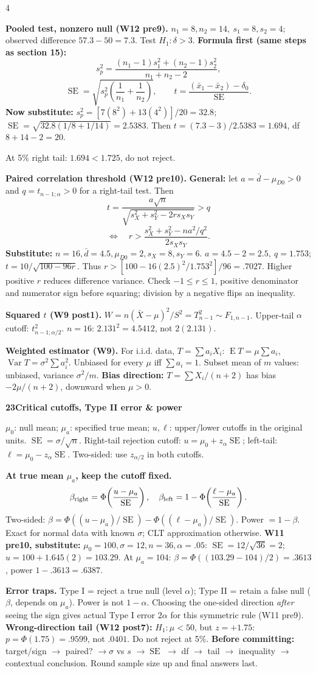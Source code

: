 \documentclass[a4paper,landscape]{article}
\newcommand{\head}[2][late]{\par\vspace{3pt}\noindent\colorbox{#1}{\parbox{\dimexpr\linewidth-6pt}{\color{white}\bfseries #2}}\par\vspace{1pt}}
\newcommand{\cue}[1]{\par\textbf{#1}\enspace}
\newcommand{\E}{\operatorname{E}}
\newcommand{\V}{\operatorname{Var}}
\newcommand{\SE}{\operatorname{SE}}
\newcommand{\xb}{\bar x}
\newcommand{\Xb}{\bar X}
\newcommand{\db}{\bar d}
\begin{document}
\begin{multicols*}{4}
\cue{Pooled test, nonzero null (W12 pre9).}
\(n_1=8,n_2=14,\ s_1=8,s_2=4\); observed difference \(57.3-50=7.3\). Test \(H_1:\delta>3\).
\textbf{Formula first (same steps as section 15):}
\[s_p^2=\frac{(n_1-1)s_1^2+(n_2-1)s_2^2}{n_1+n_2-2},\]
\[\SE=\sqrt{s_p^2\!\left(\frac1{n_1}+\frac1{n_2}\right)},\qquad
 t=\frac{(\xb_1-\xb_2)-\delta_0}{\SE}.\]
\textbf{Now substitute:} \(s_p^2=[7(8^2)+13(4^2)]/20=32.8\); \(\SE=\sqrt{32.8(1/8+1/14)}=2.5383\). Then \(t=(7.3-3)/2.5383=1.694\), df \(8+14-2=20\).\par
At 5\% right tail: \(1.694<1.725\), do not reject.
\cue{Paired correlation threshold (W12 pre10).}
\textbf{General:} let \(a=\db-\mu_{D0}>0\) and \(q=t_{n-1;\alpha}>0\) for a right-tail test. Then
\[t=\frac{a\sqrt n}{\sqrt{s_X^2+s_Y^2-2rs_Xs_Y}}>q\]
\[\Longleftrightarrow\quad r>\frac{s_X^2+s_Y^2-na^2/q^2}{2s_Xs_Y}.\]
\textbf{Substitute:}
\(n=16,\db=4.5,\mu_{D0}=2,s_X=8,s_Y=6\).
\(a=4.5-2=2.5,\ q=1.753\); \(t=10/\sqrt{100-96r}\). Thus \(r>[100-16(2.5)^2/1.753^2]/96=.7027\).
Higher positive \(r\) reduces difference variance. Check \(-1\le r\le1\), positive denominator and numerator sign before squaring; division by a negative flips an inequality.
\cue{Squared \(t\) (W9 post1).} \(W=n(\Xb-\mu)^2/S^2=T_{n-1}^2\sim F_{1,n-1}\). Upper-tail \(\alpha\) cutoff: \(t_{n-1;\alpha/2}^2\). \(n=16\): \(2.131^2=4.5412\), not \(2(2.131)\).
\cue{Weighted estimator (W9).} For i.i.d. data, \(T=\sum a_iX_i\): \(\E T=\mu\sum a_i\), \(\V T=\sigma^2\sum a_i^2\). Unbiased for every \(\mu\) iff \(\sum a_i=1\). Subset mean of \(m\) values: unbiased, variance \(\sigma^2/m\).
\textbf{Bias direction:} \(T=\sum X_i/(n+2)\) has bias \(-2\mu/(n+2)\), downward when \(\mu>0\).
\head{23\quad Critical cutoffs, Type II error \& power}
\(\mu_0\): null mean; \(\mu_a\): specified true mean; \(u,\ell\): upper/lower cutoffs in the original units.
\(\SE=\sigma/\sqrt n\). Right-tail rejection cutoff: \(u=\mu_0+z_\alpha\SE\); left-tail: \(\ell=\mu_0-z_\alpha\SE\). Two-sided: use \(z_{\alpha/2}\) in both cutoffs.
\cue{At true mean \(\mu_a\), keep the cutoff fixed.}
\[\beta_{\rm right}=\Phi\!\left(\frac{u-\mu_a}{\SE}\right),\quad
 \beta_{\rm left}=1-\Phi\!\left(\frac{\ell-\mu_a}{\SE}\right).\]
Two-sided: \(\beta=\Phi((u-\mu_a)/\SE)-\Phi((\ell-\mu_a)/\SE)\). Power \(=1-\beta\). Exact for normal data with known \(\sigma\); CLT approximation otherwise.
\textbf{W11 pre10, substitute:} \(\mu_0=100,\sigma=12,n=36,\alpha=.05\): \(\SE=12/\sqrt{36}=2\); \(u=100+1.645(2)=103.29\). At \(\mu_a=104\): \(\beta=\Phi((103.29-104)/2)=.3613\), power \(1-.3613=.6387\).
\cue{Error traps.} Type I = reject a true null (level \(\alpha\)); Type II = retain a false null (\(\beta\), depends on \(\mu_a\)). Power is not \(1-\alpha\). Choosing the one-sided direction \emph{after} seeing the sign gives actual Type I error \(2\alpha\) for this symmetric rule (W11 pre9).
\textbf{Wrong-direction tail (W12 post7):} \(H_1:\mu<50\), but \(z=+1.75\): \(p=\Phi(1.75)=.9599\), not \(.0401\). Do not reject at 5\%.
\textbf{Before committing:} target/sign \(\to\) paired? \(\to\sigma\) vs \(s\) \(\to\SE\) \(\to\) df \(\to\) tail \(\to\) inequality \(\to\) contextual conclusion. Round sample size up and final answers last.
\end{multicols*}
\end{document}
